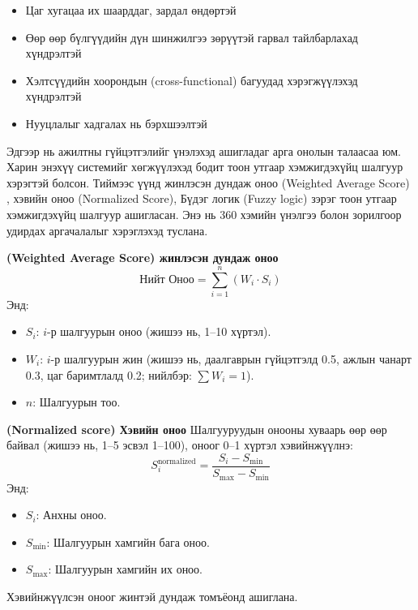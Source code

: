 \begin{enumerate}
\begin{enumerate}
\begin{itemize}
\begin{itemize}
                \item Цаг хугацаа их шаарддаг, зардал өндөртэй
                \item Өөр өөр бүлгүүдийн дүн шинжилгээ зөрүүтэй гарвал тайлбарлахад хүндрэлтэй
                \item Хэлтсүүдийн хоорондын (cross-functional) багуудад хэрэгжүүлэхэд хүндрэлтэй
                \item Нууцлалыг хадгалах нь бэрхшээлтэй
            \end{itemize}
        \end{itemize}
    \end{enumerate}
\end{enumerate}

Эдгээр нь ажилтны гүйцэтгэлийг үнэлэхэд ашигладаг арга онолын талаасаа юм. Харин энэхүү системийг хөгжүүлэхэд
бодит тоон утгаар хэмжигдэхүйц шалгуур хэрэгтэй болсон. Тиймээс үүнд жинлэсэн дундаж оноо (Weighted Average Score) , 
хэвийн оноо (Normalized Score), Бүдэг логик (Fuzzy logic) зэрэг тоон утгаар хэмжигдэхүйц шалгуур
ашигласан. Энэ нь 360 хэмийн үнэлгээ болон зорилгоор удирдах аргачалалыг хэрэглэхэд туслана.

\textbf{(Weighted Average Score) жинлэсэн дундаж оноо}
\begin{equation}
\text{Нийт Оноо} = \sum_{i=1}^{n} (W_i \cdot S_i)
\end{equation}
Энд:
\begin{itemize}
    \item \( S_i \): \( i \)-р шалгуурын оноо (жишээ нь, 1--10 хүртэл).
    \item \( W_i \): \( i \)-р шалгуурын жин (жишээ нь, даалгаврын гүйцэтгэлд 0.5, ажлын чанарт 0.3, цаг баримтлалд 0.2; нийлбэр: \(\sum W_i = 1\)).
    \item \( n \): Шалгуурын тоо.
\end{itemize}

\textbf{(Normalized score) Хэвийн оноо}
Шалгууруудын онооны хуваарь өөр өөр байвал (жишээ нь, 1--5 эсвэл 1--100), оноог 0--1 хүртэл хэвийнжүүлнэ:
\begin{equation}
S_i^{\text{normalized}} = \frac{S_i - S_{\text{min}}}{S_{\text{max}} - S_{\text{min}}}
\end{equation}
Энд:
\begin{itemize}
    \item \( S_i \): Анхны оноо.
    \item \( S_{\text{min}} \): Шалгуурын хамгийн бага оноо.
    \item \( S_{\text{max}} \): Шалгуурын хамгийн их оноо.
\end{itemize}
Хэвийнжүүлсэн оноог жинтэй дундаж томъёонд ашиглана.

